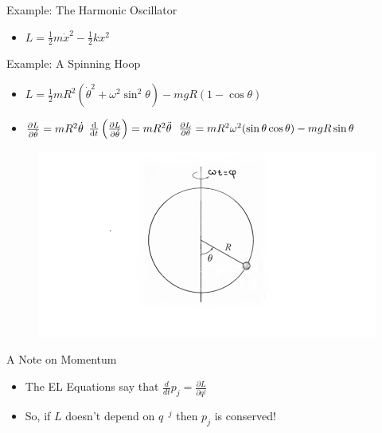 \documentclass[10pt,xcolor={table,dvipsnames},t]{beamer}
\begin{document}
\begin{frame}{Example: The Harmonic Oscillator}
\begin{itemize}
    \item $L = \frac{1}{2}m\dot{x}^2 - \frac{1}{2}kx^2$
\end{itemize}
\end{frame}



\begin{frame}{Example: A Spinning Hoop}
    \begin{itemize}
        \item $L = \frac{1}{2}mR^2(\dot{\theta}^2 + \omega^2\sin^2{\theta}) - mgR(1-\cos{\theta})$ \newline
        \item $\frac{\partial L}{\vspace{1pt}\partial \dot{\theta}} = mR^2 \dot{\theta}$ \hspace{10pt}
        $\dv{t}\left(\frac{\partial L}{\partial \dot{\theta}}\right) = mR^2 \ddot{\theta}$ \hspace{10pt}$\pdv{L}{\theta} = mR^2 \omega^2 (\sin\theta \cos\theta) - mgR\sin\theta$ 
    \end{itemize}
    \begin{figure}
        \hspace{-3in}
        \includegraphics[scale=0.4]{bead_on_hoop.png}
        \label{fig:bead_on_hoop}
    \end{figure}
\end{frame}

\begin{frame}{A Note on Momentum}
    \begin{itemize}
        \item The EL Equations say that $\frac{d}{dt} p_j = \frac{\partial L}{\partial q^j}$
        \item So, if $L$ doesn't depend on $q^{\textrm{ }j}$ then $p_j$ is conserved!
    \end{itemize}
\end{frame}
\end{document}
